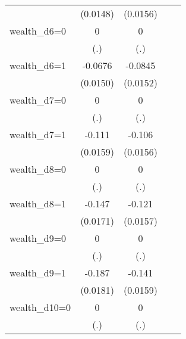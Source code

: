 \begin{table}[htbp]
\begin{tabular}{l*{4}{c}}
                & (0.0148)         & (0.0156)         &                  &                  \\
\addlinespace
wealth\_d6=0     &        0         &        0         &                  &                  \\
                &      (.)         &      (.)         &                  &                  \\
\addlinespace
wealth\_d6=1     &  -0.0676\sym{***}&  -0.0845\sym{***}&                  &                  \\
                & (0.0150)         & (0.0152)         &                  &                  \\
\addlinespace
wealth\_d7=0     &        0         &        0         &                  &                  \\
                &      (.)         &      (.)         &                  &                  \\
\addlinespace
wealth\_d7=1     &   -0.111\sym{***}&   -0.106\sym{***}&                  &                  \\
                & (0.0159)         & (0.0156)         &                  &                  \\
\addlinespace
wealth\_d8=0     &        0         &        0         &                  &                  \\
                &      (.)         &      (.)         &                  &                  \\
\addlinespace
wealth\_d8=1     &   -0.147\sym{***}&   -0.121\sym{***}&                  &                  \\
                & (0.0171)         & (0.0157)         &                  &                  \\
\addlinespace
wealth\_d9=0     &        0         &        0         &                  &                  \\
                &      (.)         &      (.)         &                  &                  \\
\addlinespace
wealth\_d9=1     &   -0.187\sym{***}&   -0.141\sym{***}&                  &                  \\
                & (0.0181)         & (0.0159)         &                  &                  \\
\addlinespace
wealth\_d10=0    &        0         &        0         &                  &                  \\
                &      (.)         &      (.)         &                  &                  \\

\end{tabular}
\end{table}
